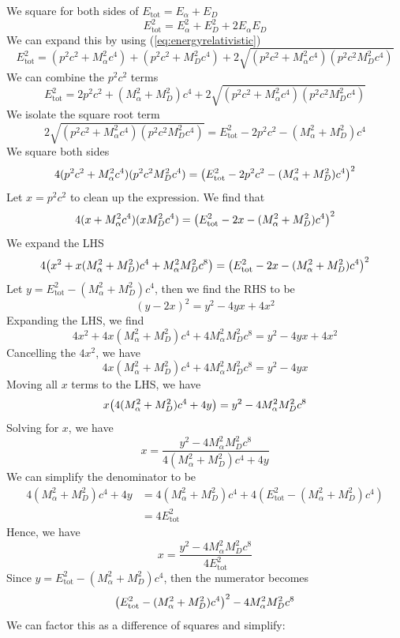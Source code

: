 \documentclass[12pt,a4paper]{article}
\begin{document}
\begin{solution_pset}
			We square for both sides of $E_\text{tot} = E_\alpha + E_D$
			\[
				E^2_\text{tot} = E_\alpha^2 + E_D^2 + 2E_\alpha E_D
			\]
			We can expand this by using (\ref{eq:energyrelativistic})
			\[
				E^2_\text{tot} =
				(p^2c^2 + M_\alpha^2 c^4) + 
				(p^2c^2 + M_D^2 c^4) + 
				2\sqrt{(p^2c^2 + M_\alpha^2c^4)(p^2c^2 M_D^2 c^4)}
			\]
			We can combine the $p^2c^2$ terms
			\[
				E^2_\text{tot} =
				2p^2c^2 + (M_\alpha^2 + M_D^2)c^4 +
				2\sqrt{(p^2c^2 + M_\alpha^2c^4)(p^2c^2 M_D^2 c^4)}
			\]
			We isolate the square root term
			\[
				2\sqrt{(p^2c^2 + M_\alpha^2c^4)(p^2c^2 M_D^2 c^4)}
				=
				E^2_\text{tot} -
				2p^2c^2 - (M_\alpha^2 + M_D^2)c^4 
			\]
			We square both sides
			\[
				4{(p^2c^2 + M_\alpha^2c^4)(p^2c^2 M_D^2 c^4)}
				=
				\pqty{
					E^2_\text{tot} -
					2p^2c^2 - (M_\alpha^2 + M_D^2)c^4 
				}^2
			\]
			Let $x=p^2c^2$ to clean up the expression. We find that
			\[
				4{(x + M_\alpha^2c^4)(x M_D^2 c^4)}
				=
				\pqty{
					E^2_\text{tot} -
					2x - (M_\alpha^2 + M_D^2)c^4 
				}^2
			\]
			We expand the LHS
			\[
				4\pqty{
					x^2 + x(M_\alpha^2 + M_D^2)c^4 + M_\alpha^2 M_D^2 c^8
				}
				=
				\pqty{
					E^2_\text{tot} -
					2x - (M_\alpha^2 + M_D^2)c^4 
				}^2
			\]
			Let $y = E_\text{tot}^2 - (M_\alpha^2 + M_D^2)c^4$, then we find the RHS to be
			\[
				(y - 2x)^2 = y^2 - 4yx + 4x^2
			\]
			Expanding the LHS, we find
			\[
				4x^2 + 4x(M_\alpha^2 + M_D^2)c^4 + 4M_\alpha^2 M_D^2 c^8
				=
				y^2 - 4yx + 4x^2
			\]
			Cancelling the $4x^2$, we have
			\[
				4x(M_\alpha^2 + M_D^2)c^4 + 4M_\alpha^2 M_D^2 c^8
				=
				y^2 - 4yx 
			\]
			Moving all $x$ terms to the LHS, we have
			\[
				x\pqty{4(M_\alpha^2 + M_D^2)c^4 + 4y}
				=
				y^2 -  4M_\alpha^2 M_D^2 c^8
			\]
			Solving for $x$, we have
			\[
				x = 
				\frac{
					y^2 -  4M_\alpha^2 M_D^2 c^8
				}{
					4(M_\alpha^2 + M_D^2)c^4 + 4y
				} 
			\]
			We can simplify the denominator to be
			\begin{align*}
				4(M_\alpha^2 + M_D^2)c^4 + 4y
				&= 
				4(M_\alpha^2 + M_D^2)c^4 + 4(E_\text{tot}^2 - (M_\alpha^2 + M_D^2)c^4)\\
				&= 4E_\text{tot}^2
			\end{align*}
			Hence, we have
			\[
				x = 
				\frac{
					y^2 -  4M_\alpha^2 M_D^2 c^8
				}{
					4E_\text{tot}^2
				} 
			\]
			Since $y =E_\text{tot}^2 - (M_\alpha^2 + M_D^2)c^4 $, then the numerator becomes
			\[
				\pqty{E_\text{tot}^2 - (M_\alpha^2 + M_D^2)c^4}^2 - 
				4M_\alpha^2 M_D^2 c^8
			\]
			We can factor this as a difference of squares and simplify:
			\begin{align*}

\end{align*}
\end{solution_pset}
\end{document}
